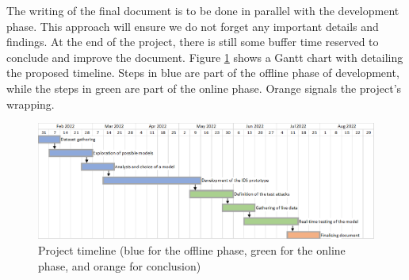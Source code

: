 
The writing of the final document is to be done in parallel with the development phase. This approach will ensure we do not forget any important details and findings. At the end of the project, there is still some buffer time reserved to conclude and improve the document. Figure \ref{fig:timeline} shows a Gantt chart with detailing the proposed timeline. Steps in blue are part of the offline phase of development, while the steps in green are part of the online phase. Orange signals the project's wrapping.

%    

\begin{figure}
    \centering
    \includegraphics[width = \textwidth]{img/parts/conclusion/timeline.png}
    \caption{Project timeline (blue for the offline phase, green for the online phase, and orange for conclusion)}
    \label{fig:timeline}
\end{figure}
